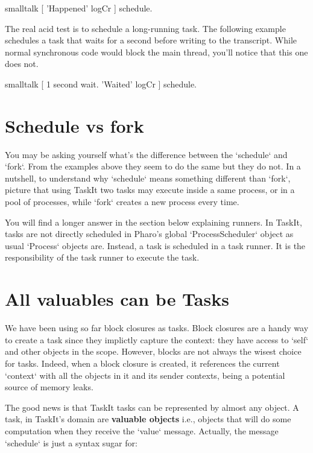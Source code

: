 \documentclass[10pt,twoside,english]{_support/latex/sbabook/sbabook}
\begin{document}
\begin{displaycode}{smalltalk}
[ 'Happened' logCr ] schedule.
\end{displaycode}

The real acid test is to schedule a long-running task. The following example schedules a task that waits for a second before writing to the transcript. While normal synchronous code would block the main thread, you'll notice that this one does not. 

\begin{displaycode}{smalltalk}
[ 1 second wait.
'Waited' logCr ] schedule.
\end{displaycode}
\section{Schedule vs fork}
You may be asking yourself what's the difference between the `schedule` and `fork`. From the examples above they seem to do the same but they do not. In a nutshell, to understand why `schedule` means something different than `fork`, picture that using TaskIt two tasks may execute inside a same process, or in a pool of processes, while `fork` creates a new process every time.

You will find a longer answer in the section below explaining runners. In TaskIt, tasks are not directly scheduled in Pharo's global `ProcessScheduler` object as usual `Process` objects are. Instead, a task is scheduled in a task runner. It is the responsibility of the task runner to execute the task.
\section{All valuables can be Tasks}
We have been using so far block closures as tasks. Block closures are a handy way to create a task since they implictly capture the context: they have access to `self` and other objects in the scope. However, blocks are not always the wisest choice for tasks. Indeed, when a block closure is created, it references the current `context` with all the objects in it and its sender contexts, being a potential source of memory leaks.

The good news is that TaskIt tasks can be represented by almost any object. A task, in TaskIt's domain are \textbf{valuable objects} i.e., objects that will do some computation when they receive the `value` message. Actually, the message `schedule` is just a syntax sugar for:
\end{document}
